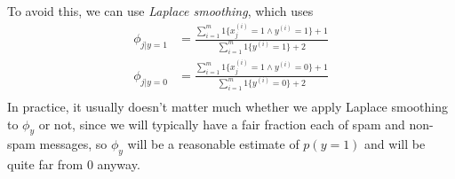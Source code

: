 To avoid this, we can use \emph{Laplace smoothing}, which uses 
\begin{align*}
    \phi_{j | y = 1} & = \frac{\sum _{i=1}^ m 1\{x_j^{(i)} = 1 \land y^{(i)} = 1\} + 1}
                              {\sum _{i=1}^ m 1\{y^{(i)} = 1\} + 2} \\
    \phi_{j | y = 0} & = \frac{\sum _{i=1} ^ m 1\{x_j^{(i)} = 1 \land y^{(i)} = 0\} + 1}
                              {\sum _{i=1}^m 1\{y^{(i)} = 0\} + 2} \\
\end{align*}
In practice, it usually doesn’t matter much whether we apply Laplace smoothing to $\phi_y$ or not,
since we will typically have a fair fraction each of spam and non-spam messages, so $\phi_y$ 
will be a reasonable estimate of $p(y = 1)$ and will be quite far from 0 anyway. 


